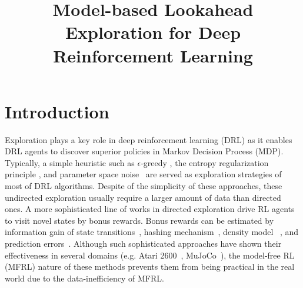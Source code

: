 \documentclass{article} %
\title{Model-based Lookahead Exploration for Deep Reinforcement Learning}
\begin{document}
\maketitle

\begin{abstract}

\end{abstract}

\section{Introduction}
Exploration plays a key role in deep reinforcement learning (DRL) as it enables DRL agents to discover superior policies in Markov Decision Process (MDP). Typically, a simple heuristic such as $\epsilon$-greedy \cite{mnih2015human}, the entropy regularization principle \cite{mnih2016a3c}, and parameter space noise~\cite{plappert2018paramnoise,fortunato2018noisy} are served as exploration strategies of most of DRL algorithms. Despite of the simplicity of these approaches, these undirected exploration usually require a larger amount of data than directed ones. A more sophisticated line of works in directed exploration drive RL agents to visit novel states by bonus rewards. Bonus rewards can be estimated by information gain of state transitions~\cite{houthooft2016vime}, hashing mechanism~\cite{tang2017exploration}, density model ~\cite{bellemare2016unifying, ostrovski2017count}, and prediction errors~\cite{stadie2015incentivizing,pathak2017curiosity}. Although such sophisticated approaches have shown their effectiveness in several domains (e.g. Atari 2600~\cite{bellemare13arcade}, MuJoCo~\cite{todorov2012mujoco}), the model-free RL (MFRL) nature of these methods prevents them from being practical in the real world due to the data-inefficiency of MFRL.
\end{document}
